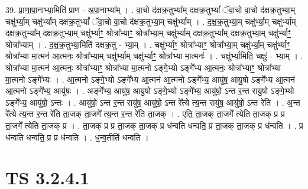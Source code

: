 \documentclass[17pt]{extarticle}
\begin{document}
39. प्रा॒णा॒पा॒नाभ्या॒मिति॑ प्राण - अ॒पा॒नाभ्या᳚म् । . वा॒चो द॑क्षक्र॒तुभ्या᳚म् दक्षक्र॒तुभ्यां᳚ ॅवा॒चो वा॒चो द॑क्षक्र॒तुभ्या॒म् चक्षु॑र्भ्या॒म् चक्षु॑र्भ्याम् दक्षक्र॒तुभ्यां᳚ ॅवा॒चो वा॒चो द॑क्षक्र॒तुभ्या॒म् चक्षु॑र्भ्याम् । . द॒क्ष॒क्र॒तुभ्या॒म् चक्षु॑र्भ्या॒म् चक्षु॑र्भ्याम् दक्षक्र॒तुभ्या᳚म् दक्षक्र॒तुभ्या॒म् चक्षु॑र्भ्याꣳ॒॒ श्रोत्रा᳚भ्याꣳ॒॒ श्रोत्रा᳚भ्या॒म् चक्षु॑र्भ्याम् दक्षक्र॒तुभ्या᳚म् दक्षक्र॒तुभ्या॒म् चक्षु॑र्भ्याꣳ॒॒ श्रोत्रा᳚भ्याम् । . द॒क्ष॒क्र॒तुभ्या॒मिति॑ दक्षक्र॒तु - भ्या॒म् । . चक्षु॑र्भ्याꣳ॒॒ श्रोत्रा᳚भ्याꣳ॒॒ श्रोत्रा᳚भ्या॒म् चक्षु॑र्भ्या॒म् चक्षु॑र्भ्याꣳ॒॒ श्रोत्रा᳚भ्या मा॒त्मन॑ आ॒त्मनः॒ श्रोत्रा᳚भ्या॒म् चक्षु॑र्भ्या॒म् चक्षु॑र्भ्याꣳ॒॒ श्रोत्रा᳚भ्या मा॒त्मनः॑ । . चक्षु॑र्भ्या॒मिति॒ चक्षुः॑ - भ्या॒म् । . श्रोत्रा᳚भ्या मा॒त्मन॑ आ॒त्मनः॒ श्रोत्रा᳚भ्याꣳ॒॒ श्रोत्रा᳚भ्या मा॒त्मनो ऽङ्गे॒भ्यो ऽङ्गे᳚भ्य आ॒त्मनः॒ श्रोत्रा᳚भ्याꣳ॒॒ श्रोत्रा᳚भ्या मा॒त्मनो ऽङ्गे᳚भ्यः । . आ॒त्मनो ऽङ्गे॒भ्यो ऽङ्गे᳚भ्य आ॒त्मन॑ आ॒त्मनो ऽङ्गे᳚भ्य॒ आयु॑ष॒ आयु॒षो ऽङ्गे᳚भ्य आ॒त्मन॑ आ॒त्मनो ऽङ्गे᳚भ्य॒ आयु॑षः । . अङ्गे᳚भ्य॒ आयु॑ष॒ आयु॒षो ऽङ्गे॒भ्यो ऽङ्गे᳚भ्य॒ आयु॑षो॒ ऽन्त र॒न्त रायु॒षो ऽङ्गे॒भ्यो ऽङ्गे᳚भ्य॒ आयु॑षो॒ ऽन्तः । . आयु॑षो॒ ऽन्त र॒न्त रायु॑ष॒ आयु॑षो॒ ऽन्त रे᳚त्ये त्य॒न्त रायु॑ष॒ आयु॑षो॒ ऽन्त रे॑ति । . अ॒न्त रे᳚त्ये त्य॒न्त र॒न्त रे॑ति ता॒जक् ता॒जगे᳚ त्य॒न्त र॒न्त रे॑ति ता॒जक् । . ए॒ति॒ ता॒जक् ता॒जगे᳚ त्येति ता॒जक् प्र प्र ता॒जगे᳚ त्येति ता॒जक् प्र । . ता॒जक् प्र प्र ता॒जक् ता॒जक् प्र ध॑न्वति धन्वति॒ प्र ता॒जक् ता॒जक् प्र ध॑न्वति । . प्र ध॑न्वति धन्वति॒ प्र प्र ध॑न्वति । . ध॒न्व॒तीति॑ धन्वति । \newline
\pagebreak
{}

\section{ TS 3.2.4.1 }
\end{document}
